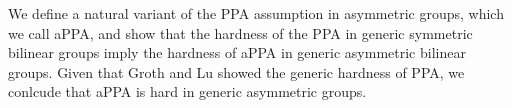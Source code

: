 We define a natural variant of the PPA assumption in asymmetric groups, which we call aPPA, and show that the hardness of the PPA in generic symmetric bilinear groups imply the hardness of aPPA in generic asymmetric bilinear groups. Given that Groth and Lu showed the generic hardness of PPA, we conlcude that aPPA is hard in generic asymmetric groups. 

%
